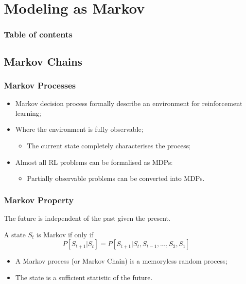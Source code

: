 
\section{Modeling as Markov}

\begin{frame}
    \frametitle{Table of contents}
    \tableofcontents
\end{frame} 


\subsection{Markov Chains}
\begin{frame}
    \frametitle{Markov Processes}

    \begin{itemize}
        \item Markov decision process formally describe an environment
        for reinforcement learning;

        \item Where the environment is {\color{red}fully observable};
        \begin{itemize}
            \item The current state completely characterises the process;
        \end{itemize}
        \item Almost all RL problems can be formalised as MDPs:
        \begin{itemize}
            \item Partially observable problems can be converted into MDPs.
        \end{itemize}
    \end{itemize} 

\end{frame}






\begin{frame}
    \frametitle{Markov Property}
    \centering
    {\color{red}The future is independent of the past given the present.}


    \begin{definition}
        A state $S_t$ is Markov if only if
        $$P[S_{t+1}|S_t] = P[S_{t+1}|S_t,S_{t-1},...,S_2,S_1]$$
    \end{definition}

    \begin{itemize}
        \item A Markov process (or Markov Chain) is a memoryless random process;
        \item The state is a sufficient statistic of the future.
    \end{itemize}

\end{frame}


